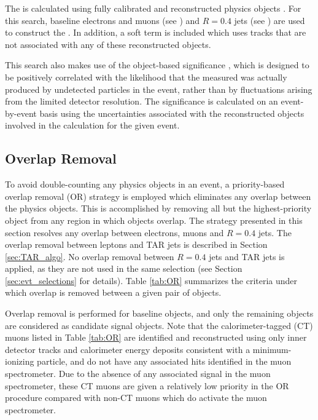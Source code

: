 The \met is calculated using fully calibrated and reconstructed physics objects \cite{PERF-2016-07}. For this search, baseline electrons and muons (see \Sect{\ref{sec:charged_leptons}}) and \(R=0.4\) jets (see \Sect{\ref{sec:atk4_jets}}) are used to construct the \met. In addition, a soft term is included which uses tracks that are not associated with any of these reconstructed objects. 

This search also makes use of the object-based \met significance \metsig \cite{ATLAS-CONF-2018-038}, which is designed to be positively correlated with the likelihood that the measured \met was actually produced by undetected particles in the event, rather than by fluctuations arising from the limited detector resolution. The \met significance is calculated on an event-by-event basis using the uncertainties associated with the reconstructed objects involved in the \met calculation for the given event.

\subsection{Overlap Removal}

To avoid double-counting any physics objects in an event, a priority-based overlap removal (OR) strategy is employed which eliminates any overlap between the physics objects. This is accomplished by removing all but the highest-priority object from any region in which objects overlap. The strategy presented in this section resolves any overlap between electrons, muons and \(R=0.4\) \smallR jets. The overlap removal between leptons and TAR jets is described in Section \ref{sec:TAR_algo}. No overlap removal between \(R=0.4\) jets and TAR jets is applied, as they are not used in the same selection (see Section \ref{sec:evt_selections} for details). Table \ref{tab:OR} summarizes the criteria under which overlap is removed between a given pair of objects. 

Overlap removal is performed for baseline objects, and only the remaining objects are considered as candidate signal objects. Note that the calorimeter-tagged (CT) muons \cite{muon_reco} listed in Table \ref{tab:OR} are identified and reconstructed using only inner detector tracks and calorimeter energy deposits consistent with a minimum-ionizing particle, and do not have any associated hits identified in the muon spectrometer. Due to the absence of any associated signal in the muon spectrometer, these CT muons are given a relatively low priority in the OR procedure compared with non-CT muons which do activate the muon spectrometer.

